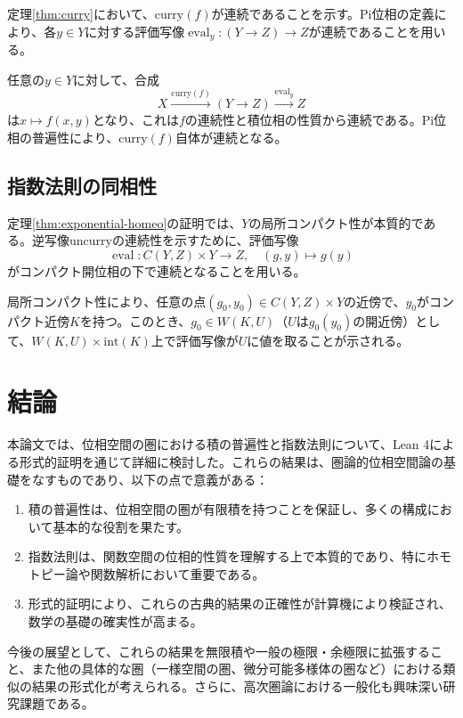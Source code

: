 \documentclass[uplatex, a4paper]{jlreq}
\newcommand{\curry}{\mathrm{curry}}
\newcommand{\uncurry}{\mathrm{uncurry}}
\DeclareMathOperator{\eval}{eval}
\begin{document}
定理\ref{thm:curry}において、$\curry(f)$が連続であることを示す。Pi位相の定義により、各$y \in Y$に対する評価写像$\eval_y: (Y \to Z) \to Z$が連続であることを用いる。

任意の$y \in Y$に対して、合成
\[
X \xrightarrow{\curry(f)} (Y \to Z) \xrightarrow{\eval_y} Z
\]
は$x \mapsto f(x, y)$となり、これは$f$の連続性と積位相の性質から連続である。Pi位相の普遍性により、$\curry(f)$自体が連続となる。

\subsection{指数法則の同相性}

定理\ref{thm:exponential-homeo}の証明では、$Y$の局所コンパクト性が本質的である。逆写像$\uncurry$の連続性を示すために、評価写像
\[
\eval: C(Y, Z) \times Y \to Z, \quad (g, y) \mapsto g(y)
\]
がコンパクト開位相の下で連続となることを用いる。

局所コンパクト性により、任意の点$(g_0, y_0) \in C(Y, Z) \times Y$の近傍で、$y_0$がコンパクト近傍$K$を持つ。このとき、$g_0 \in W(K, U)$（$U$は$g_0(y_0)$の開近傍）として、$W(K, U) \times \mathrm{int}(K)$上で評価写像が$U$に値を取ることが示される。

\section{結論}

本論文では、位相空間の圏における積の普遍性と指数法則について、Lean 4による形式的証明を通じて詳細に検討した。これらの結果は、圏論的位相空間論の基礎をなすものであり、以下の点で意義がある：

\begin{enumerate}
\item 積の普遍性は、位相空間の圏が有限積を持つことを保証し、多くの構成において基本的な役割を果たす。
\item 指数法則は、関数空間の位相的性質を理解する上で本質的であり、特にホモトピー論や関数解析において重要である。
\item 形式的証明により、これらの古典的結果の正確性が計算機により検証され、数学の基礎の確実性が高まる。
\end{enumerate}

今後の展望として、これらの結果を無限積や一般の極限・余極限に拡張すること、また他の具体的な圏（一様空間の圏、微分可能多様体の圏など）における類似の結果の形式化が考えられる。さらに、高次圏論における一般化も興味深い研究課題である。
\end{document}
